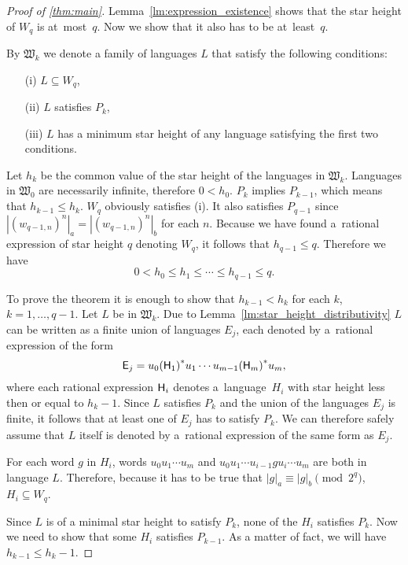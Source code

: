 \begin{proof}[Proof of \autoref*{thm:main}]
    Lemma~\ref*{lm:expression_existence} shows that the star height of $W_q$ is at~most~$q$. Now we show that it also has to be at~least~$q$.

    By $\mathfrak{W}_k$ we denote a family of languages $L$ that satisfy the following conditions:
    \begin{itemize}
        \item[(i)] $L \subseteq W_q$,
        \item[(ii)] $L$ satisfies $P_k$,
        \item[(iii)] $L$ has a minimum star height of any language satisfying the first two conditions.
    \end{itemize}

    Let $h_k$ be the common value of the star height of the languages in $\mathfrak{W}_k$. Languages in $\mathfrak{W}_0$ are necessarily infinite, therefore $0 < h_0$. $P_k$ implies $P_{k-1}$, which means that $h_{k-1} \leq h_k$. $W_q$ obviously satisfies (i). It also satisfies $P_{q-1}$ since $|{(w_{q-1,n})}^n|_a = |{(w_{q-1,n})}^n|_b$ for each $n$. Because we have found a~rational expression of star height $q$ denoting $W_q$, it follows that $h_{q-1} \leq q$. Therefore we have
    \[
        0 < h_0 \leq h_1 \leq \dotsb \leq h_{q-1} \leq q.
    \]

    To prove the theorem it is enough to show that $h_{k-1} < h_k$ for each $k$, $k=1, \dotsc, q-1$. Let $L$ be in $\mathfrak{W}_k$. Due to Lemma~\ref*{lm:star_height_distributivity} $L$ can be written as a finite union of languages $E_j$, each denoted by a~rational expression of the form
    \[
        {\mathsf{E}}_j = u_0{({\mathsf{H}}_1)}^*u_1 \dotsm u_{m-1}{({\mathsf{H}}_m)}^*u_m,
    \]
    where each rational expression ${\mathsf{H}}_i$ denotes a~language~$H_i$ with star height less then or equal to $h_k-1$. Since $L$ satisfies $P_k$ and the union of the languages $E_j$ is finite, it follows that at least one of $E_j$ has to satisfy $P_k$. We can therefore safely assume that $L$ itself is denoted by a~rational expression of the same form as $E_j$.

    For each word $g$ in $H_i$, words $u_0 u_1 \dotsm u_m$ and $u_0 u_1 \dotsm u_{i-1} g u_i \dotsm u_m$ are both in language $L$. Therefore, because it has to be true that $|g|_a \equiv |g|_b \pmod{2^q}$, $H_i \subseteq W_q$.

    Since $L$ is of a minimal star height to satisfy $P_k$, none of the $H_i$ satisfies $P_k$. Now we need to show that some $H_i$ satisfies $P_{k-1}$. As a matter of fact, we will have $h_{k-1} \leq h_k - 1$.


\end{proof}
